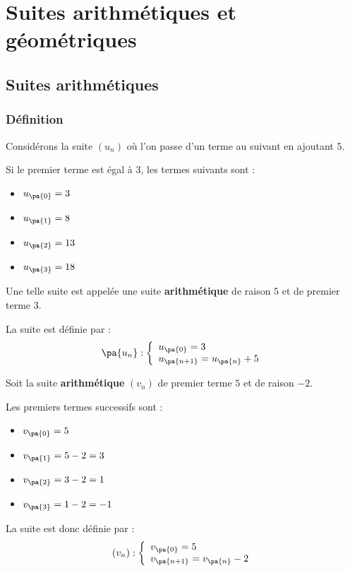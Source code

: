 \chapter{Suites arithmétiques et géométriques}

\section{Suites arithmétiques}

\subsection{Définition}

\begin{ex}
	Considérons la suite $(u_{n})$ où l'on passe d'un terme au suivant en ajoutant $5$.

	Si le premier terme est égal à $3$, les termes suivants sont :

	\begin{itemize}
		\item $u_{\pa{0}} = 3$
		\item $u_{\pa{1}} = 8$
		\item $u_{\pa{2}} = 13$
		\item $u_{\pa{3}} = 18$
	\end{itemize}

	Une telle suite est appelée une suite \textbf{arithmétique} de raison $5$ et de premier terme $3$.

	La suite est définie par :
	\[
		\pa{u_n}:\left\{ \begin{array}{l}u_{\pa{0}} = 3\\u_{\pa{n + 1}} = u_{\pa{n}} + 5\end{array}\right.
	\]
\end{ex}

\begin{ex}
	Soit la suite \textbf{arithmétique} $(v_{n})$ de premier terme $5$ et de raison $-2$.

	Les premiers termes successifs sont :

	\begin{itemize}
		\item $v_{\pa{0}}=5$
		\item $v_{\pa{1}}=5-2 = 3$
		\item $v_{\pa{2}}=3-2 = 1$
		\item $v_{\pa{3}}=1-2 = -1$
	\end{itemize}

	La suite est donc définie par :
	\[
		(v_n):\left\{ \begin{array}{l}v_{\pa{0}} = 5 \\ v_{\pa{n + 1}} = v_{\pa{n}}-2\end{array} \right.
	\]
\end{ex}

